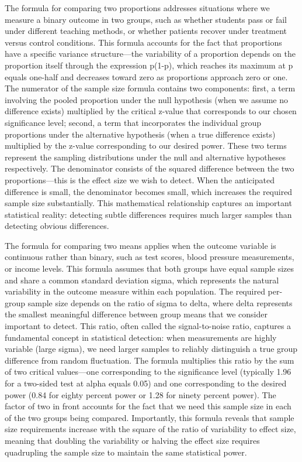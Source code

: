 \documentclass[
  letterpaper,
  DIV=11,
  numbers=noendperiod]{scrreprt}
\begin{document}
The formula for comparing two proportions addresses situations where we
measure a binary outcome in two groups, such as whether students pass or
fail under different teaching methods, or whether patients recover under
treatment versus control conditions. This formula accounts for the fact
that proportions have a specific variance structure---the variability of
a proportion depends on the proportion itself through the expression
p(1-p), which reaches its maximum at p equals one-half and decreases
toward zero as proportions approach zero or one. The numerator of the
sample size formula contains two components: first, a term involving the
pooled proportion under the null hypothesis (when we assume no
difference exists) multiplied by the critical z-value that corresponds
to our chosen significance level; second, a term that incorporates the
individual group proportions under the alternative hypothesis (when a
true difference exists) multiplied by the z-value corresponding to our
desired power. These two terms represent the sampling distributions
under the null and alternative hypotheses respectively. The denominator
consists of the squared difference between the two proportions---this is
the effect size we wish to detect. When the anticipated difference is
small, the denominator becomes small, which increases the required
sample size substantially. This mathematical relationship captures an
important statistical reality: detecting subtle differences requires
much larger samples than detecting obvious differences.

The formula for comparing two means applies when the outcome variable is
continuous rather than binary, such as test scores, blood pressure
measurements, or income levels. This formula assumes that both groups
have equal sample sizes and share a common standard deviation sigma,
which represents the natural variability in the outcome measure within
each population. The required per-group sample size depends on the ratio
of sigma to delta, where delta represents the smallest meaningful
difference between group means that we consider important to detect.
This ratio, often called the signal-to-noise ratio, captures a
fundamental concept in statistical detection: when measurements are
highly variable (large sigma), we need larger samples to reliably
distinguish a true group difference from random fluctuation. The formula
multiplies this ratio by the sum of two critical values---one
corresponding to the significance level (typically 1.96 for a two-sided
test at alpha equals 0.05) and one corresponding to the desired power
(0.84 for eighty percent power or 1.28 for ninety percent power). The
factor of two in front accounts for the fact that we need this sample
size in each of the two groups being compared. Importantly, this formula
reveals that sample size requirements increase with the square of the
ratio of variability to effect size, meaning that doubling the
variability or halving the effect size requires quadrupling the sample
size to maintain the same statistical power.
\end{document}
